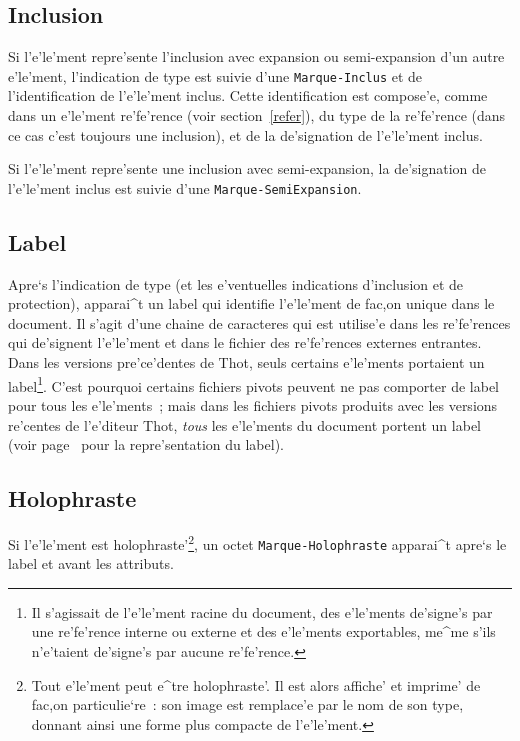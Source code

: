 \subsection{Inclusion}

Si l'e'le'ment repre'sente l'inclusion avec expansion ou semi-expansion d'un
autre e'le'ment,
l'indication de type est suivie d'une {\tt Marque-Inclus} et de
l'identification de l'e'le'ment inclus. Cette identification est compose'e,
comme dans un e'le'ment re'fe'rence (voir section~\ref{refer}), du type de
la re'fe'rence (dans ce cas c'est toujours une inclusion), et de la
de'signation de l'e'le'ment inclus.

Si l'e'le'ment repre'sente une inclusion avec semi-expansion, la de'signation
de l'e'le'ment inclus est suivie d'une {\tt Marque-SemiExpansion}.

\subsection{Label}
\label{labelelem}

Apre`s l'indication de type (et les e'ventuelles indications d'inclusion et
de protection), apparai^t un label qui identifie l'e'le'ment de fac,on unique
dans le document. Il s'agit d'une chaine de caracteres qui est utilise'e dans les
re'fe'rences qui de'signent l'e'le'ment et dans le fichier des re'fe'rences
externes entrantes.
Dans les versions pre'ce'dentes de Thot, seuls certains e'le'ments portaient
un label\footnote{Il s'agissait de l'e'le'ment racine du document, des
e'le'ments de'signe's par une re'fe'rence interne ou externe et des e'le'ments
exportables, me^me s'ils n'e'taient de'signe's par aucune re'fe'rence.}.
C'est pourquoi certains fichiers pivots peuvent ne pas comporter de label
pour tous les e'le'ments~; mais dans les fichiers pivots produits avec
les versions re'centes de l'e'diteur Thot, {\em tous} les e'le'ments du
document portent un label (voir page~\pageref{label} pour la repre'sentation
du label).

\subsection{Holophraste}

Si l'e'le'ment est holophraste'\footnote{Tout e'le'ment peut e^tre
holophraste'. Il est alors affiche' et imprime' de fac,on particulie`re~: son
image est remplace'e par le nom de son type, donnant ainsi une forme plus
compacte de l'e'le'ment.}, un octet {\tt Marque-Holophraste} apparai^t apre`s
le label et avant les attributs.

